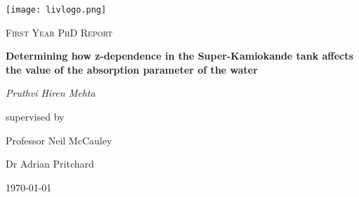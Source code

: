 \documentclass[11pt,oneside,a4paper]{article}
\begin{document}
\begin{titlepage}
	\centering
	\texttt{[image: livlogo.png]}\par\vspace{1cm}
	\vspace{1cm}
	{\scshape\Large First Year PhD Report\par}
	\vspace{1.5cm}
	{\huge\bfseries Determining how z-dependence in the Super-Kamiokande tank affects the value of the absorption parameter of the water\par}
	\vspace{2cm}
	{\Large\itshape Pruthvi Hiren Mehta\par}
	\vfill
	supervised by\par
	Professor Neil McCauley\par 
	Dr Adrian Pritchard\par  
	\vfill
	
	{\large \today\par}
\end{titlepage}




\tableofcontents
\newpage







\begin{abstract}
The absorption parameter of the water in the Super-Kamiokande tank is calculated for each light injector position by using corrected TOF plots and doing a $\chi^{2}$ comparison between MC and `fake data'. The absorption parameter values are calculated for two normalisation cases: normalising using the number of injected photons and the total charge in the Super-Kamiokande tank. The calculated values for both cases are consistent with the expected values, aside for the B5 injector position for the photon normalisation case. As predicted, the photon normalisation case gives more accurate results for the values with the uncertainty in the value reduced by a factor of 2 compared to the total charge normalisation case. A description of the UK light injection system is given as well as its improvements over the Korean system, including information on the use of the three optics and the benefit of using a collimated beam.
\end{abstract}
\newpage
\end{document}
